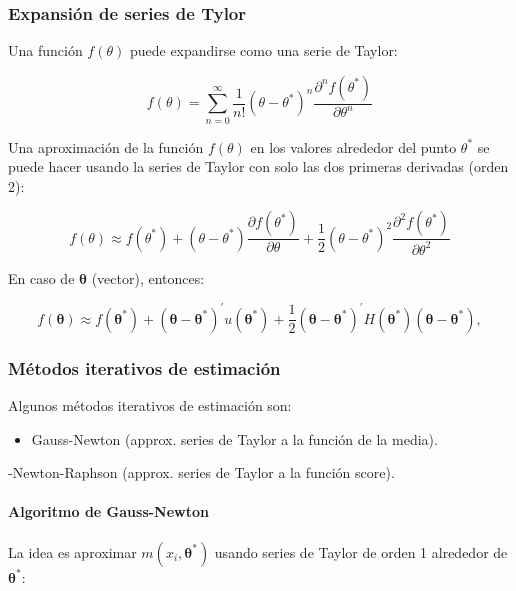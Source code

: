 \documentclass[
]{article}
\providecommand{\tightlist}{%
  \setlength{\itemsep}{0pt}\setlength{\parskip}{0pt}}
\begin{document}
\hypertarget{expansiuxf3n-de-series-de-tylor}{%
\subsubsection{Expansión de series de Tylor}\label{expansiuxf3n-de-series-de-tylor}}

Una función \(f(\theta)\) puede expandirse como una serie de Taylor:

\[
f(\theta)=\sum_{n=0}^\infty \frac{1}{n!}(\theta-\theta^*)^n \frac{\partial^nf(\theta^*)}{\partial\theta^n}
\]

Una aproximación de la función \(f(\theta)\) en los valores alrededor del punto \(\theta^*\) se puede hacer usando la series de Taylor con solo las dos primeras
derivadas (orden 2):

\[
f(\theta)\approx f(\theta^*)+(\theta-\theta^*) \frac{\partial f(\theta^*)}{\partial\theta}+\frac{1}{2}(\theta-\theta^*)^2\frac{\partial^2 f(\theta^*)}{\partial\theta^2}
\]

En caso de \(\boldsymbol \theta\) (vector), entonces:

\[
f(\boldsymbol \theta)\approx f(\boldsymbol \theta^*)+(\boldsymbol \theta-\boldsymbol \theta^*)^{'}u(\boldsymbol \theta^*)+\frac{1}{2}(\boldsymbol \theta-\boldsymbol \theta^*)^{'}H(\boldsymbol \theta^*)(\boldsymbol \theta-\boldsymbol \theta^*),
\]

\hypertarget{muxe9todos-iterativos-de-estimaciuxf3n}{%
\subsubsection{Métodos iterativos de estimación}\label{muxe9todos-iterativos-de-estimaciuxf3n}}

Algunos métodos iterativos de estimación son:

\begin{itemize}
\tightlist
\item
  Gauss-Newton (approx. series de Taylor a la función de la
  media).
\end{itemize}

-Newton-Raphson (approx. series de Taylor a la función score).

\hypertarget{algoritmo-de-gauss-newton}{%
\paragraph{Algoritmo de Gauss-Newton}\label{algoritmo-de-gauss-newton}}

La idea es aproximar \(m(x_{i},\boldsymbol \theta^*)\) usando series de Taylor de orden 1 alrededor de \(\boldsymbol \theta^*\):
\end{document}
